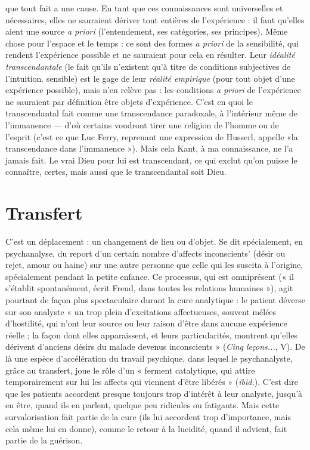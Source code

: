 que tout fait a une cause. En tant que ces connaissances sont universelles et nécessaires,
elles ne sauraient dériver tout entières de l’expérience : il faut qu’elles aient
une source {\it a priori} (l'entendement, ses catégories, ses principes). Même chose
pour l’espace et le temps : ce sont des formes {\it a priori} de la sensibilité, qui rendent
l'expérience possible et ne sauraient pour cela en résulter. Leur {\it idéalité transcendantale}
(le fait qu’ils n’existent qu’à titre de conditions subjectives de l'intuition.
sensible) est le gage de leur {\it réalité empirique} (pour tout objet d’une expérience
possible), mais n’en relève pas : les conditions {\it a priori} de l'expérience ne sauraient
par définition être objets d’expérience. C’est en quoi le transcendantal fait
comme une transcendance paradoxale, à l’intérieur même de l’immanence — d’où
certains voudront tirer une religion de l’homme ou de l'esprit (c’est ce que Luc
Ferry, reprenant une expression de Husserl, appelle «la transcendance dans
l’immanence »). Mais cela Kant, à ma connaissance, ne l’a jamais fait. Le vrai
Dieu pour lui est transcendant, ce qui exclut qu’on puisse le connaître, certes,
mais aussi que le transcendantal soit Dieu.

\section{Transfert}
C'est un déplacement : un changement de lieu ou d’objet. Se
dit spécialement, en psychanalyse, du report d’un certain
nombre d’affects inconscients’ (désir ou rejet, amour ou haine) sur une autre
personne que celle qui les suscita à l’origine, spécialement pendant la petite
enfance. Ce processus, qui est omniprésent (« il s’établit spontanément, écrit
Freud, dans toutes les relations humaines »), agit pourtant de façon plus spectaculaire
durant la cure analytique : le patient déverse sur son analyste « un trop
plein d’excitations affectueuses, souvent mélées d’hostilité, qui n’ont leur
source ou leur raison d’être dans aucune expérience réelle ; la façon dont elles
apparaissent, et leurs particularités, montrent qu’elles dérivent d’anciens désirs
du malade devenus inconscients » ({\it Cinq leçons...}, V). De là une espèce d’accélération
du travail psychique, dans lequel le psychanalyste, grâce au transfert,
joue le rôle d’un « ferment catalytique, qui attire temporairement sur lui les
affects qui viennent d’être libérés » ({\it ibid.}). C’est dire que les patients accordent
presque toujours trop d'intérêt à leur analyste, jusqu’à en être, quand ils en parlent,
quelque peu ridicules ou fatigants. Mais cette survalorisation fait partie de
la cure (ils lui accordent trop d'importance, mais cela même lui en donne),
comme le retour à la lucidité, quand il advient, fait partie de la guérison.

